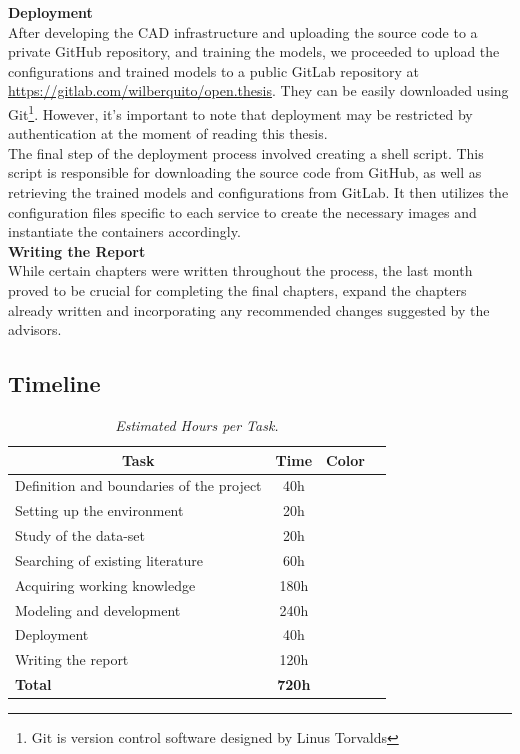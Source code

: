 \vspace{0.5cm}
\textbf{Deployment} \\

After developing the CAD infrastructure and uploading the source code to a private GitHub repository, and training the models,
we proceeded to upload the configurations and trained models to a public
GitLab repository at \url{https://gitlab.com/wilberquito/open.thesis}.
They can be easily downloaded using Git\footnote{Git is version control software designed by Linus Torvalds}.
However, it's important to note that deployment may be restricted by authentication at the moment of reading this thesis. \\

The final step of the deployment process involved creating a shell script.
This script is responsible for downloading the source code from GitHub,
as well as retrieving the trained models and configurations from GitLab.
It then utilizes the configuration files specific to each service to create the necessary
images and instantiate the containers accordingly. \\

\vspace{0.5cm}
\textbf{Writing the Report} \\

While certain chapters were written throughout the process, the last month proved to be crucial for completing the final chapters, expand the chapters already written and incorporating any recommended changes suggested by the advisors.


\subsection{Timeline}

\begin{table}[H]
\centering
\begin{tabular}{| l | c | c | c |}
\hline
\multicolumn{1}{|c|}{\textbf{Task}} & \multicolumn{1}{c|}{\textbf{Time}} & \multicolumn{1}{c|}{\textbf{Color}} \\
\hline
Definition and boundaries of the project & 40h & \cellcolor{red!50} \\
\hline
Setting up the environment & 20h & \cellcolor{lime!50} \\
\hline
Study of the data-set & 20h & \cellcolor{blue!40} \\
\hline
Searching of existing literature & 60h & \cellcolor{teal!50} \\
\hline
Acquiring working knowledge & 180h & \cellcolor{amber!30} \\
\hline
Modeling and development & 240h & \cellcolor{black!70} \\
\hline
Deployment & 40h & \cellcolor{gray!50} \\
\hline
Writing the report & 120h & \cellcolor{orange!50} \\
\hline
\textbf{Total} & \textbf{720h} & \\
\hline
\end{tabular}
\caption[Estimated Hours per Task.]{\textit{Estimated Hours per Task.}}
{\label{table:timeline_tasks}}
\end{table}

